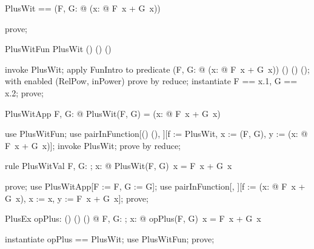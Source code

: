 \documentclass{article}
\begin{document}
\begin{zed}
  PlusWit == (\lambda F, G: \nat \fun \nat @ (\lambda x: \nat @ F~x + G~x))
\end{zed}

\begin{zproof}
prove;
\end{zproof}

\begin{theorem}{PlusWitFun}
  PlusWit \in (\nat \fun \nat) \cross (\nat \fun \nat) \fun (\nat \fun \nat)
\end{theorem}

\begin{zproof}
invoke PlusWit;
apply FunIntro to predicate (\lambda F, G: \nat \fun \nat @ (\lambda x: \nat @ F~x + G~x)) \in (\nat \fun \nat) \cross (\nat \fun \nat) \fun (\nat \fun \nat);
with enabled (RelPow, inPower) prove by reduce;
instantiate F == x.1, G == x.2;
prove;
\end{zproof}

\begin{theorem}{PlusWitApp}
  \forall F, G: \nat \fun \nat @ PlusWit(F, G) = (\lambda x: \nat @ F~x + G~x)
\end{theorem}

\begin{zproof}
use PlusWitFun;
use pairInFunction[(\nat \fun \nat) \cross (\nat \fun \nat), \nat \fun \nat][f := PlusWit, x := (F, G), y := (\lambda x: \nat @ F~x + G~x)];
invoke PlusWit;
prove by reduce;
\end{zproof}

\begin{theorem}{rule PlusWitVal}
  \forall F, G: \nat \fun \nat; x: \nat @ PlusWit(F, G)~x = F~x + G~x
\end{theorem}

\begin{zproof}
prove;
use PlusWitApp[F := F, G := G];
use pairInFunction[\nat, \nat][f := (\lambda x: \nat @ F~x + G~x), x := x, y := F~x + G~x];
prove;
\end{zproof}

\begin{theorem}{PlusEx}
  \exists opPlus: (\nat \fun \nat) \cross (\nat \fun \nat) \fun (\nat \fun \nat) @ \forall F, G: \nat \fun \nat; x: \nat @ opPlus(F, G)~x = F~x + G~x
\end{theorem}

\begin{zproof}
instantiate opPlus == PlusWit;
use PlusWitFun;
prove;
\end{zproof}
\end{document}
